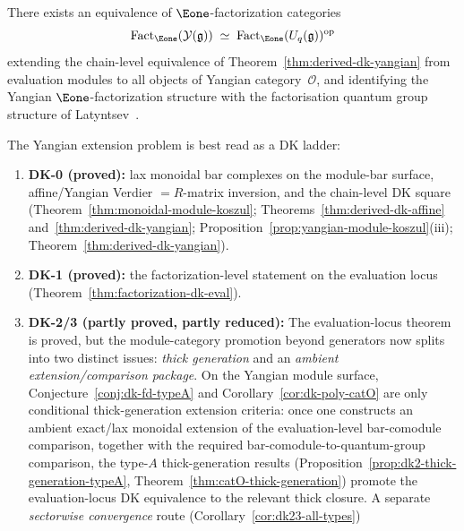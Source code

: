 \begin{conjecture}
\label{conj:derived-drinfeld-kohno}
There exists an equivalence of $\Eone$-factorization categories
\[
\operatorname{Fact}_{\Eone}(\mathcal{Y}(\mathfrak{g}))
\;\simeq\;
\operatorname{Fact}_{\Eone}(U_q(\mathfrak{g}))^{\mathrm{op}}
\]
extending the chain-level equivalence of
Theorem~\textup{\ref{thm:derived-dk-yangian}}
from evaluation modules to all objects of Yangian
category~$\mathcal{O}$, and identifying the Yangian
$\Eone$-factorization structure with the factorisation quantum
group structure of Latyntsev~\cite{Latyntsev23}.
\end{conjecture}

\begin{remark}\label{rem:derived-dk-scope}
The Yangian extension problem is best read as a DK ladder:
\begin{enumerate}[label=\textup{(\alph*)}]
\item \textbf{DK-0 (proved):} lax monoidal bar complexes on the
 module-bar surface, affine/Yangian Verdier
 $= R$-matrix inversion, and the chain-level DK square
 (Theorem~\ref{thm:monoidal-module-koszul};
 Theorems~\ref{thm:derived-dk-affine}
 and~\ref{thm:derived-dk-yangian};
 Proposition~\ref{prop:yangian-module-koszul}(iii);
 Theorem~\ref{thm:derived-dk-yangian}).
\item \textbf{DK-1 (proved):} the factorization-level statement on the
 evaluation locus (Theorem~\ref{thm:factorization-dk-eval}).
\item \textbf{DK-2/3 (partly proved, partly reduced):}
 The evaluation-locus theorem is proved, but the module-category
 promotion beyond generators now splits into two distinct issues:
 \emph{thick generation} and an \emph{ambient
 extension/comparison package}. On the Yangian module surface,
 Conjecture~\ref{conj:dk-fd-typeA} and Corollary~\ref{cor:dk-poly-catO}
 are only conditional thick-generation extension criteria: once one
 constructs an ambient exact/lax monoidal extension of the
 evaluation-level bar-comodule comparison, together with the required
 bar-comodule-to-quantum-group comparison, the type-$A$
 thick-generation results
 \textup{(}Proposition~\ref{prop:dk2-thick-generation-typeA},
 Theorem~\ref{thm:catO-thick-generation}\textup{)} promote the
 evaluation-locus DK equivalence to the relevant thick closure. A
 separate \emph{sectorwise convergence} route
 \textup{(}Corollary~\ref{cor:dk23-all-types}\textup{)}

\end{enumerate}
\end{remark}
